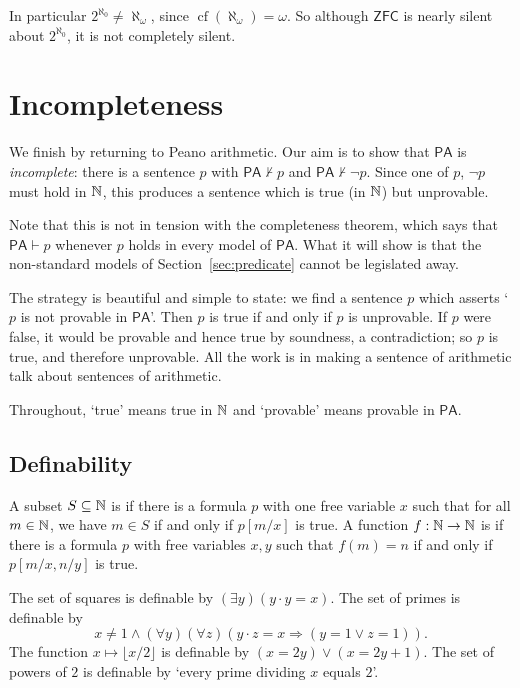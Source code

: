 \documentclass[a4paper]{scrartcl}
\newcommand{\cf}{\operatorname{cf}}
\newcommand{\PA}{\mathsf{PA}}
\newcommand{\ZFC}{\mathsf{ZFC}}
\begin{document}
In particular $2^{\aleph_0} \neq \aleph_\omega$, since $\cf(\aleph_\omega) = \omega$. So although $\ZFC$ is nearly silent about $2^{\aleph_0}$, it is not completely silent.

\section{Incompleteness}\label{sec:incompleteness}

We finish by returning to Peano arithmetic. Our aim is to show that $\PA$ is \emph{incomplete}: there is a sentence $p$ with $\PA \not\vdash p$ and $\PA \not\vdash \lnot p$. Since one of $p$, $\lnot p$ must hold in $\mathbb{N}$, this produces a sentence which is true (in $\mathbb{N}$) but unprovable.

Note that this is not in tension with the completeness theorem, which says that $\PA \vdash p$ whenever $p$ holds in every model of $\PA$. What it will show is that the non-standard models of Section~\ref{sec:predicate} cannot be legislated away.

The strategy is beautiful and simple to state: we find a sentence $p$ which asserts `$p$ is not provable in $\PA$'. Then $p$ is true if and only if $p$ is unprovable. If $p$ were false, it would be provable and hence true by soundness, a contradiction; so $p$ is true, and therefore unprovable. All the work is in making a sentence of arithmetic talk about sentences of arithmetic.

Throughout, `true' means true in $\mathbb{N}$ and `provable' means provable in $\PA$.

\subsection{Definability}

\begin{definition}[Definable]
  A subset $S \subseteq \mathbb{N}$ is  if there is a formula $p$ with one free variable $x$ such that for all $m \in \mathbb{N}$, we have $m \in S$ if and only if $p[m/x]$ is true. A function $f: \mathbb{N} \to \mathbb{N}$ is  if there is a formula $p$ with free variables $x, y$ such that $f(m) = n$ if and only if $p[m/x, n/y]$ is true.
\end{definition}

\begin{example}
  The set of squares is definable by $(\exists y)(y \cdot y = x)$. The set of primes is definable by
  $$x \neq 1 \land (\forall y)(\forall z)(y \cdot z = x \Rightarrow (y = 1 \lor z = 1)).$$
  The function $x \mapsto \lfloor x/2 \rfloor$ is definable by $(x = 2y) \lor (x = 2y + 1)$. The set of powers of $2$ is definable by `every prime dividing $x$ equals $2$'.
\end{example}
\end{document}
